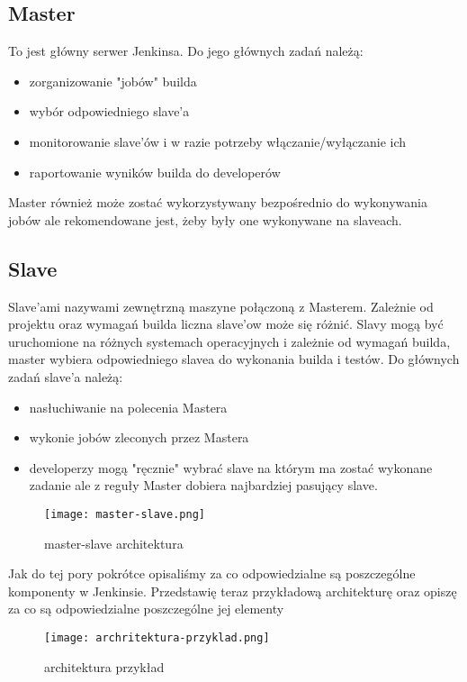 \subsection{Master}

To jest główny serwer Jenkinsa. Do jego głównych zadań należą:
\begin{itemize}
    \item zorganizowanie "jobów" builda
    \item wybór odpowiedniego slave'a
    \item monitorowanie slave'ów i w razie potrzeby włączanie/wyłączanie ich
    \item raportowanie wyników builda do developerów
\end{itemize}

Master również może zostać wykorzystywany bezpośrednio do wykonywania jobów ale rekomendowane jest, żeby były one wykonywane na slaveach.

\subsection{Slave}

Slave'ami nazywami zewnętrzną maszyne połączoną z Masterem. Zależnie od projektu oraz wymagań builda liczna slave'ow może się różnić. Slavy mogą być uruchomione na różnych systemach operacyjnych i zależnie od wymagań builda, master wybiera odpowiedniego slavea do wykonania builda i testów. 
Do głównych zadań slave'a należą:
\begin{itemize}
    \item nasłuchiwanie na polecenia Mastera
    \item wykonie jobów zleconych przez Mastera
    \item developerzy mogą "ręcznie" wybrać slave na którym ma zostać wykonane zadanie ale z reguły Master dobiera najbardziej pasujący slave.
\end{itemize}

\begin{figure}[htbp]
    \centering
    \texttt{[image: master-slave.png]}
    \caption{master-slave architektura}
    \label{fig:master-slave}
\end{figure}

Jak do tej pory pokrótce opisaliśmy za co odpowiedzialne są poszczególne komponenty w Jenkinsie. Przedstawię teraz przykładową architekturę oraz opiszę za co są odpowiedzialne poszczególne jej elementy 

\begin{figure}[htbp]
    \centering
    \texttt{[image: archritektura-przyklad.png]}
    \caption{architektura przykład}
    \label{fig:jenkins-architektura}
\end{figure}

